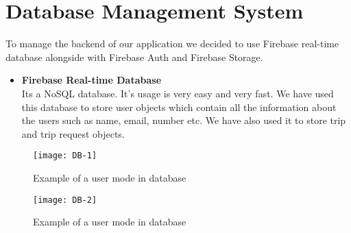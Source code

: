 \section{Database Management System}
To manage the backend of our application we decided to use Firebase real-time database alongside with Firebase Auth and Firebase Storage. 
\begin{itemize}
\item \textbf{Firebase Real-time Database }\\

Its a NoSQL database. It's usage is very easy and very fast. We have used this database to store user objects which contain all the information about the users such as name, email, number etc. We have also used it to store trip and trip request objects.

\end{itemize}
\begin{figure}[ht]
\center
\texttt{[image: DB-1]} 
\caption{Example of a user mode in database}
\label{fig:Example of a user mode in database}
\end{figure}
\begin{figure}[ht]
\center
\texttt{[image: DB-2]} 
\caption{Example of a user mode in database}
\label{fig:Example of a user mode in database}
\end{figure}
